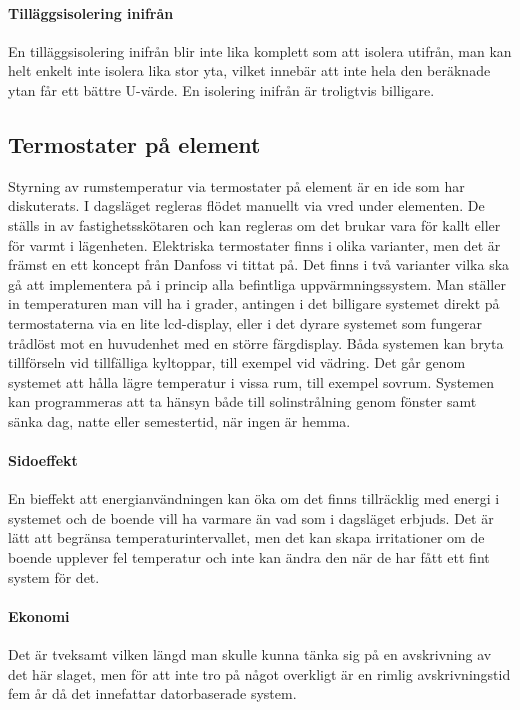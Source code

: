 \paragraph{Tilläggsisolering inifrån}
En tilläggsisolering inifrån blir inte lika komplett som att isolera utifrån, man kan helt enkelt inte isolera lika stor yta, vilket innebär att inte hela den beräknade ytan får ett bättre U-värde. En isolering inifrån är troligtvis billigare.

\subsection{Termostater på element}
Styrning av rumstemperatur via termostater på element är en ide som har diskuterats. I dagsläget regleras flödet manuellt via vred under elementen. De ställs in av fastighetsskötaren och kan regleras om det brukar vara för kallt eller för varmt i lägenheten. 
Elektriska termostater finns i olika varianter, men det är främst en ett koncept från Danfoss vi tittat på. Det finns i två varianter vilka ska gå att implementera på i princip alla befintliga uppvärmningssystem. Man ställer in temperaturen man vill ha i grader, antingen i det billigare systemet direkt på termostaterna via en lite lcd-display, eller i det dyrare systemet som fungerar trådlöst mot en huvudenhet med en större färgdisplay. 
Båda systemen kan bryta tillförseln vid tillfälliga kyltoppar, till exempel vid vädring. Det går genom systemet att hålla lägre temperatur i vissa rum, till exempel sovrum. Systemen kan programmeras att ta hänsyn både till solinstrålning genom fönster samt sänka dag, natte eller semestertid, när ingen är hemma.

\paragraph{Sidoeffekt}
En bieffekt att energianvändningen kan öka om det finns tillräcklig med energi i systemet och de boende vill ha varmare än vad som i dagsläget erbjuds. Det är lätt att begränsa temperaturintervallet, men det kan skapa irritationer om de boende upplever fel temperatur och inte kan ändra den när de har fått ett fint system för det.

\paragraph{Ekonomi}
Det är tveksamt vilken längd man skulle kunna tänka sig på en avskrivning av det här slaget, men för att inte tro på något overkligt är en rimlig avskrivningstid fem år då det innefattar datorbaserade system.


